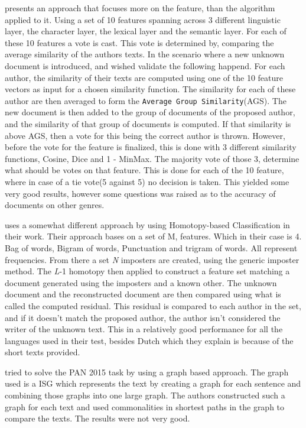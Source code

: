 \cite{castro2015} presents an approach that focuses more on the feature, than 
the algorithm applied to it. Using a set of 10 features spanning across 3 
different linguistic layer, the character layer, the lexical layer and the 
semantic layer. For each of these 10 features a vote is cast.
This vote is determined by, comparing the average similarity of the authors 
texts. In the scenario where a new unknown document is introduced, and wished 
validate the following happend.
For each author, the similarity of their texts are computed using one of the 10 
feature vectors as input for a chosen similarity function. The similarity for 
each of these author are then averaged to form the \texttt{Average Group 
Similarity}(AGS). The new document is then added to the group of documents of 
the proposed author, and the similarity of that group of documents is computed. 
If that similarity is above AGS, then a vote for this being the correct author 
is thrown.
However, before the vote for the feature is finalized, this is done with 3 
different similarity functions, Cosine, Dice and 1 - MinMax. The majority vote 
of those 3, determine what should be votes on that feature. This is done for 
each of the 10 feature, where in case of a tie vote(5 against 5) no decision is 
taken. This yielded some very good results, however some questions was raised 
as to the accuracy of documents on other genres.


\cite{gutierrez20150} uses a somewhat different approach by using Homotopy-based 
Classification in their work. Their approach bases on a set of M, features. 
Which in their case is 4. Bag of words, Bigram of words, Punctuation and 
trigram of words. All represent frequencies. From there a set \textit{N} 
imposters are created, using the generic imposter method. The \textit{L}-1 
homotopy then applied to construct a feature set matching a document generated 
using the imposters and a known other. The unknown document and the 
reconstructed document are then compared using what is called the computed 
residual. This residual is compared to each author in the set, and if it 
doesn't match the proposed author,  the author isn't considered the writer of 
the unknown text. This in a relatively good performance for all the languages 
used in their test, besides Dutch which they explain is because of the short 
texts provided. 

\cite{gomezadorno2015} tried to solve the PAN 2015 task by using a graph based
approach. The graph used is a \gls{ISG} which represents the text by creating a
graph for each sentence and combining those graphs into one large graph. The
authors constructed such a graph for each text and used commonalities in
shortest paths in the graph to compare the texts. The results were not very
good.



